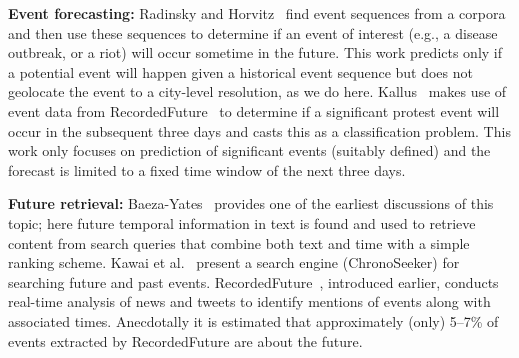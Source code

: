 {\bf Event forecasting:} 
Radinsky and Horvitz~ find event sequences from a corpora and then use these sequences to determine if 
an event of interest (e.g., a disease outbreak, or a riot)
will occur sometime in the future. This work predicts only if a potential event will happen given a historical event sequence
but does not geolocate the event to a city-level resolution, as we do here.
Kallus~ makes use of event data from 
RecordedFuture~\cite{recordedFuture} to determine if a  significant protest event will occur in 
the subsequent three days and casts this as a classification problem.
This work only focuses on prediction of significant events (suitably defined) and
the forecast is limited to a fixed time window
of the next three days. 
%

{\bf Future retrieval:}
Baeza-Yates~ provides one of the earliest discussions
of this topic; here future temporal information in text is found and used to retrieve content from search queries that 
combine both text and time with a simple ranking scheme. 
Kawai et al.~ present a search engine (ChronoSeeker) for searching 
future and past events.
RecordedFuture~\cite{recordedFuture}, introduced earlier, conducts
real-time analysis of news and tweets to identify mentions of events along with associated times. Anecdotally it 
is estimated that approximately (only) 5--7\% of events extracted 
by RecordedFuture are about the future.
\iffalse
Tops et al.~\shortcite{tops2013predicting} aim to classify a tweet talking about an event into discrete time segments and thereby predict the 
`time to event'.
Bosch et al.~\shortcite{bosch2013estm} use regression techniques to identify the time to an event referred to by a tweet.
Jatowt et al.~\shortcite{Jatowt:2011:ECE} provide a collective image of the future associated with an entity summarizing all future related information available.
Becker et al.~\shortcite{Becker:2012:ICP} try to identify more content about known planned events (e.g., a concert) across social media. This work
for instance assumes that we know the event beforehand and aims to identify relevant details of the event.
\fi

